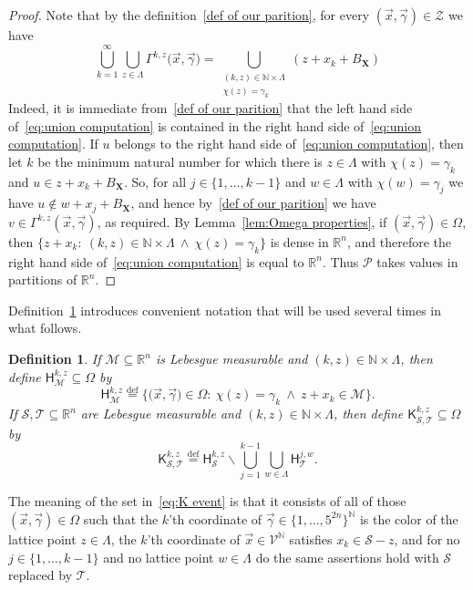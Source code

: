 \documentclass[11pt,reqno]{amsart}
\renewcommand{\setminus}{\smallsetminus}
\newcommand{\X}{\mathbf X}
\newcommand{\R}{\mathbb R}
\newtheorem{definition}[theorem]{Definition}
\theoremstyle{remark}
\renewcommand{\subset}{\subseteq}
\newcommand{\N}{\mathbb N}
\newcommand{\eqdef}{\stackrel{\mathrm{def}}{=}}
\renewcommand{\Pr}{\mathbf{Prob}}
\renewcommand{\1}{\mathbf 1}
\newcommand{\Part}{\mathscr{P}}
\newcommand{\ZZ}{\mathcal{Z}}
\newcommand{\DD}{\mathscr{V}}
\begin{document}
\begin{proof}
Note that by the definition~\eqref{def of our parition}, for every $(\vec{x},\vec{\gamma})\in \ZZ$ we have
\begin{equation}\label{eq:union computation}
\bigcup_{k=1}^\infty\bigcup_{z\in \Lambda}\Gamma^{k,z}\big(\vec{x},\vec{\gamma}\big)=\bigcup_{\substack{(k,z)\in \N\times \Lambda\\   \chi(z)=\gamma_k}}(z+x_k+B_{\X})
\end{equation}
Indeed, it is immediate from~\eqref{def of our parition} that the left hand side of~\eqref{eq:union computation} is contained in the right hand side of~\eqref{eq:union computation}.  If $u$ belongs to the right hand side of~\eqref{eq:union computation}, then let $k$ be the minimum natural number  for which there is $z\in \Lambda$ with $\chi(z)=\gamma_k$ and $u\in z+x_k+B_{\X}$. So, for all $j\in \{1,\ldots,k-1\}$ and $w\in \Lambda$ with $\chi(w)=\gamma_j$ we have $u\notin w+x_j+B_{\X}$, and hence by~\eqref{def of our parition}  we have $v\in  \Gamma^{k,z}(\vec{x},\vec{\gamma})$, as required. By Lemma~\ref{lem:Omega properties}, if $(\vec{x},\vec{\gamma})\in \Omega$, then $\{z+x_k:\ (k,z)\in \N\times \Lambda\ \wedge\  \chi(z)=\gamma_k\}$ is dense in $\R^n$, and therefore the right hand side of~\eqref{eq:union computation} is equal to $\R^n$. Thus $\Part$ takes values in partitions of $\R^n$.
\end{proof}

Definition~\ref{def:hitting sets} introduces convenient notation that will be used several times in what follows.
\begin{definition}\label{def:hitting sets} If $\mathscr{M}\subset \R^n$ is Lebesgue measurable and $(k,z)\in \N\times \Lambda$, then define $\mathsf{H}_{\mathscr{M}}^{k,z}\subset \Omega$ by
\begin{equation}\label{eq:H event}
\mathsf{H}_{\mathscr{M}}^{k,z}\eqdef \big\{\big(\vec{x},\vec{\gamma}\big)\in \Omega:\ \chi(z)=\gamma_k\ \wedge\ z+x_k\in \mathscr{M}\big\}.
\end{equation}
If $\mathscr{S},\mathscr{T}\subset \R^n$ are Lebesgue measurable and $(k,z)\in \N\times \Lambda$, then define $\mathsf{K}_{\mathscr{S,T}}^{k,z}\subset \Omega$ by
\begin{equation}\label{eq:K event}
\mathsf{K}_{\mathscr{S,T}}^{k,z}\eqdef \mathsf{H}_{\mathscr{S}}^{k,z}\setminus \bigcup_{j=1}^{k-1}\bigcup_{w\in \Lambda} \mathsf{H}_{\mathscr{T}}^{j,w}.
\end{equation}
\end{definition}
The meaning of the set in~\eqref{eq:K event} is that it consists of all of those $(\vec{x},\vec{\gamma})\in \Omega$ such that the $k$'th coordinate of $\vec{\gamma}\in \{1,\ldots,5^{2n}\}^\N$ is the color of the lattice point $z\in \Lambda$, the $k$'th coordinate of  $\vec{x}\in \DD^\N$ satisfies $x_k\in \mathscr{S}-z$, and for no $j\in \{1,\ldots,k-1\}$ and no lattice point $w\in \Lambda$ do the same assertions hold with $\mathscr{S}$ replaced by $\mathscr{T}$.
\end{document}
